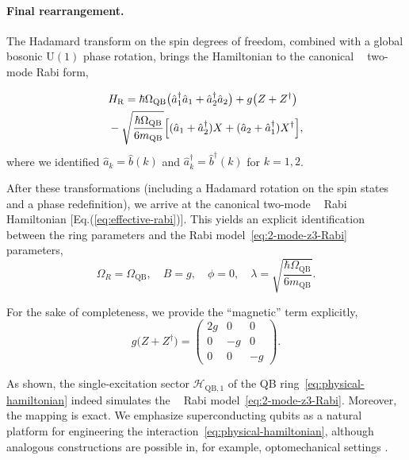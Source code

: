 \documentclass[reprint, aps, prx, amsmath, amssymb, longbibliography, superscriptaddress]{revtex4-2}
\DeclareMathOperator{\Zthree}{\mathbb{Z}_3}
\begin{document}
\paragraph{Final rearrangement.}
The Hadamard transform on the spin degrees of freedom, combined with a global
bosonic $\mathrm{U(1)}$ phase rotation, brings the Hamiltonian to the canonical
$\Zthree$ two-mode Rabi form,

\begin{align}
\label{eq:effective-rabi}
    &H_{\text{R}} = \hbar \Omega_{\text{QB}}
      \bigl( \hat a^{\dagger}_1 \hat a_1 + \hat a^{\dagger}_2 \hat a_2 \bigr)
      + g \bigl( Z + Z^{\dagger} \bigr) \notag
      \\
      &- \sqrt{ \frac{\hbar \Omega_{\text{QB}}}{6 m_{\text{QB}}} }
      \Bigl[ ( \hat a_1 + \hat a^{\dagger}_2 ) X
        + ( \hat a_2 + \hat a^{\dagger}_1 ) X^{\dagger} \Bigr],
\end{align}
where we identified $\hat a_k = \hat b(k)$ and $\hat a_k^{\dagger} = \hat b^{\dagger}(k)$ for $k = 1,2$. 

After these transformations (including a Hadamard rotation on the spin states and a phase redefinition), we arrive at the canonical two-mode $\Zthree$ Rabi Hamiltonian [Eq.(\ref{eq:effective-rabi})]. This yields an explicit identification between the ring parameters and the Rabi model~\eqref{eq:2-mode-z3-Rabi} parameters,
\begin{equation}
\label{eq:QB-RM-parameter-mapping}
  \Omega_R = \Omega_{\text{QB}},
  \quad B = g,
  \quad \phi = 0,
  \quad \lambda = \sqrt{ \frac{\hbar \Omega_{\text{QB}}}{6 m_{\text{QB}}} }.
\end{equation}

For the sake of completeness, we provide the ``magnetic'' term explicitly,
\begin{equation}
\label{eq:superconducting-magnetic-term}
  g \bigl( Z + Z^{\dagger} \bigr) =
  \begin{pmatrix}
    2 g & 0 & 0 \\
    0 & -g & 0 \\
    0 & 0 & -g
  \end{pmatrix}.
\end{equation}

As shown, the single-excitation sector $\mathcal{H}_{\text{QB},1}$ of the QB ring~\eqref{eq:physical-hamiltonian} indeed simulates the $\Zthree$ Rabi model~\eqref{eq:2-mode-z3-Rabi}. Moreover, the mapping is exact. We emphasize superconducting qubits as a natural platform for engineering the
interaction~\eqref{eq:physical-hamiltonian}, although analogous constructions are
possible in, for example, optomechanical settings \cite{sedov_chiral_2020}.
\end{document}
